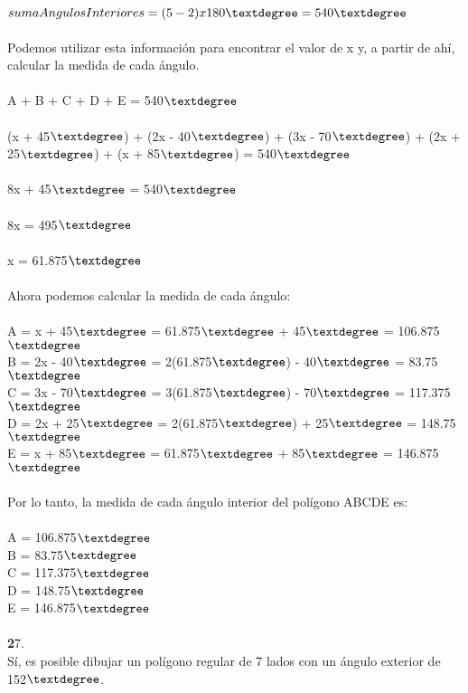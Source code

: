 \documentclass{article}
\begin{document}
\\
$sumaAngulosInteriores = (5-2) x 180\textdegree = 540\textdegree$\\
\\
Podemos utilizar esta información para encontrar el valor de x y, a partir de ahí, calcular la medida de cada ángulo.\\
\\
A + B + C + D + E = 540$\textdegree$\\
\\
(x + 45$\textdegree$) + (2x - 40$\textdegree$) + (3x - 70$\textdegree$) + (2x + 25$\textdegree$) + (x + 85$\textdegree$) = 540$\textdegree$\\
\\
8x + 45$\textdegree$ = 540$\textdegree$\\
\\
8x = 495$\textdegree$\\
\\
x = 61.875$\textdegree$\\
\\
Ahora podemos calcular la medida de cada ángulo:\\
\\
A = x + 45$\textdegree$ = 61.875$\textdegree$ + 45$\textdegree$ = 106.875$\textdegree$\\
B = 2x - 40$\textdegree$ = 2(61.875$\textdegree$) - 40$\textdegree$ = 83.75$\textdegree$\\
C = 3x - 70$\textdegree$ = 3(61.875$\textdegree$) - 70$\textdegree$ = 117.375$\textdegree$\\
D = 2x + 25$\textdegree$ = 2(61.875$\textdegree$) + 25$\textdegree$ = 148.75$\textdegree$\\
E = x + 85$\textdegree$ = 61.875$\textdegree$ + 85$\textdegree$ = 146.875$\textdegree$\\
\\
Por lo tanto, la medida de cada ángulo interior del polígono ABCDE es:\\
\\
A = 106.875$\textdegree$\\
B = 83.75$\textdegree$\\
C = 117.375$\textdegree$\\
D = 148.75$\textdegree$\\
E = 146.875$\textdegree$\\
\\
{\textbf 27. }\\
Sí, es posible dibujar un polígono regular de 7 lados con un ángulo exterior de 152$\textdegree$.\\
\end{document}
